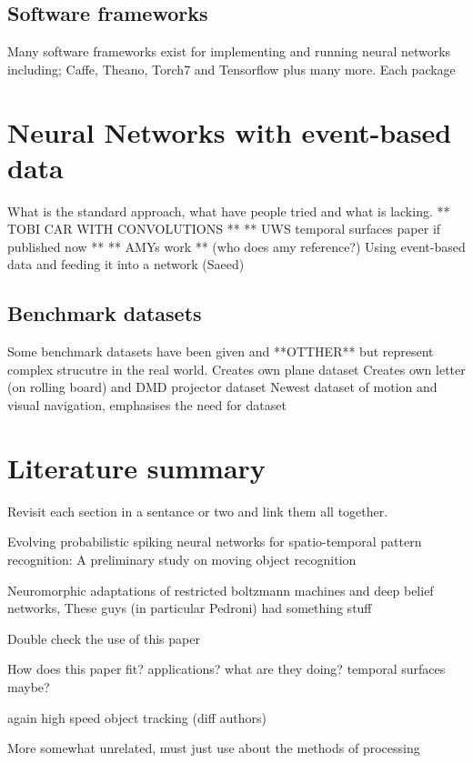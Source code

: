 \subsection{Software frameworks}   %
Many software frameworks exist for implementing and running neural networks including; Caffe\cite{jia2014caffe}, Theano\cite{bastien2012theano}, Torch7\cite{collobert2011torch7} and Tensorflow\cite{abaditensorflow} plus many more.
Each package 

\section{Neural Networks with event-based data}
What is the standard approach, what have people tried and what is lacking. \cite{OConnor2013}  ** TOBI CAR WITH CONVOLUTIONS ** ** UWS temporal surfaces paper if published now ** ** AMYs work ** (who does amy reference?)
Using event-based data and feeding it into a network (Saeed) \cite{afshar2016investigation}

\subsection{Benchmark datasets}
Some benchmark datasets have been given \cite{Gibson2014} and **OTTHER** but represent complex strucutre in the real world.
Creates own plane dataset \cite{afshar2016investigation}
Creates own letter (on rolling board) and DMD projector dataset \cite{akolkar2015can}
Newest dataset of motion and visual navigation, emphasises the need for dataset \cite{barranco2016dataset}


\section{Literature summary}      %
Revisit each section in a sentance or two and link them all together.

Evolving probabilistic spiking neural networks for spatio-temporal pattern recognition: A preliminary study on moving object recognition \cite{kasabov2011evolving}

Neuromorphic adaptations of restricted boltzmann machines and deep belief networks, These guys (in particular Pedroni) had something stuff \cite{pedroni2013neuromorphic}


Double check the use of this paper \cite{gil2014active}

How does this paper fit? applications? what are they doing? temporal surfaces maybe? \cite{davide2014high}

again high speed object tracking (diff authors) \cite{saner2014high} 

More somewhat unrelated, must just use about the methods of processing \cite{mueggler2015continuous}
